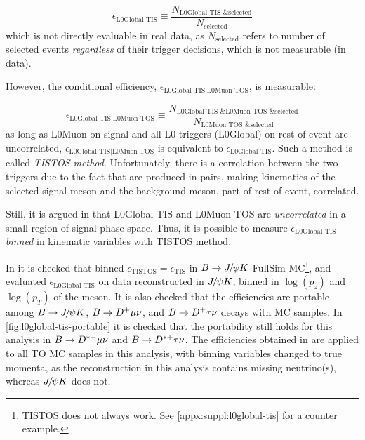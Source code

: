 \begin{equation}
    \label{eqn:eff-l0global-tis}
    \epsilon_\text{L0Global TIS} \equiv
    \frac{N_\text{L0Global TIS \& selected}}{N_\text{selected}}
\end{equation}
which is not directly evaluable in real data, as $N_\text{selected}$ refers to
number of selected events \emph{regardless} of their trigger decisions, which is
not measurable (in data).

However, the conditional efficiency, $\epsilon_\text{L0Global TIS|L0Muon TOS}$,
is measurable:

\begin{equation}
    \epsilon_\text{L0Global TIS|L0Muon TOS} \equiv
    \frac{N_\text{L0Global TIS \& L0Muon TOS \& selected}}{
          N_\text{L0Muon TOS \& selected}}
\end{equation}
as long as L0Muon on signal and all L0 triggers (L0Global) on rest of event are
uncorrelated,
$\epsilon_\text{L0Global TIS|L0Muon TOS}$ is equivalent to
$\epsilon_\text{L0Global TIS}$.
Such a method is called \emph{TISTOS method}.
Unfortunately, there is a correlation between the two triggers due to
the fact that \bbbar are produced in pairs, making kinematics of the selected
signal \B meson and the background \Bbar meson, part of rest of event,
correlated.

Still, it is argued in \cite{LHCb-PUB-2014-039} that L0Global TIS and L0Muon TOS
are \emph{uncorrelated} in a small region of signal \B phase space.
Thus, it is possible to measure $\epsilon_\text{L0Global TIS}$ \emph{binned} in
\B kinematic variables with TISTOS method.

In \cite{LHCb-INT-2019-025} it is checked that binned
$\epsilon_\text{TISTOS} = \epsilon_\text{TIS}$ in
${B} \rightarrow {\ensuremath{{J\mskip -3mu/\mskip -2mu\psi}}} K$ FullSim MC\footnote{
    TISTOS does not always work. See \cref{appx:suppl:l0global-tis} for a
    counter example.
}, and evaluated
$\epsilon_\text{L0Global TIS}$ on data reconstructed in ${{J\mskip -3mu/\mskip -2mu\psi}} K$, binned
in $\log(p_z)$ and $\log(p_T)$ of the \B meson.
It is also checked that the efficiencies are portable among
${B} \rightarrow {\ensuremath{{J\mskip -3mu/\mskip -2mu\psi}}} K$, ${B} \rightarrow {\ensuremath{{D}^+}} {\ensuremath{\mu}} {\ensuremath{\nu}}$, and
${B} \rightarrow {\ensuremath{{D}^+}} {\ensuremath{\tau}} {\ensuremath{\nu}}$ decays with MC samples.
In \cref{fig:l0global-tis-portable} it is checked
that the portability still holds for this analysis in
${B} \rightarrow {\ensuremath{{D}^{*+}}} {\ensuremath{\mu}} {\ensuremath{\nu}}$ and ${B} \rightarrow {\ensuremath{{D}^{*+}}} {\ensuremath{\tau}} {\ensuremath{\nu}}$.
The efficiencies obtained in \cite{LHCb-INT-2019-025} are applied to all TO MC
samples in this analysis, with binning variables changed to true momenta, as
the reconstruction in this analysis contains missing neutrino(s),
whereas ${{J\mskip -3mu/\mskip -2mu\psi}} K$ does not.

